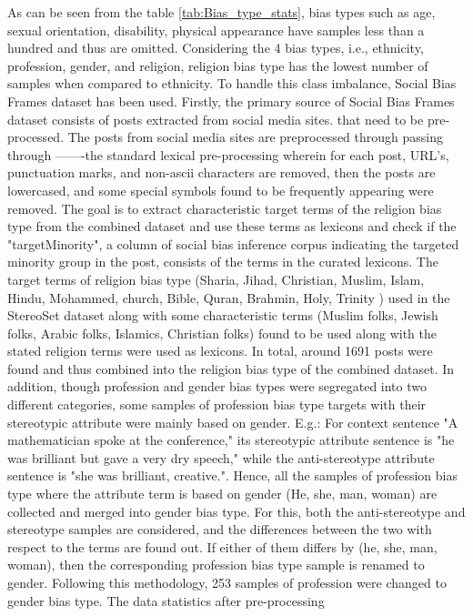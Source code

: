 As can be seen from the table \ref{tab:Bias_type_stats}, bias types such as age, sexual orientation, disability, physical appearance have samples less than a hundred and thus are omitted. Considering the 4 bias types, i.e., ethnicity, profession, gender, and religion, religion bias type has the lowest number of samples when compared to ethnicity. To handle this class imbalance, Social Bias Frames dataset has been used. Firstly, the primary source of Social Bias Frames dataset consists of posts extracted from social media sites. that need to be pre-processed. The posts from social media sites are preprocessed through passing through -------the standard lexical pre-processing wherein for each post, URL's, punctuation marks, and non-ascii characters are removed, then the posts are lowercased, and some special symbols found to be frequently appearing were removed. The goal is to extract characteristic target terms of the religion bias type from the combined dataset and use these terms as lexicons and check if the "targetMinority", a column of social bias inference corpus indicating the targeted minority group in the post, consists of the terms in the curated lexicons. The target terms of religion bias type (Sharia, Jihad, Christian, Muslim, Islam, Hindu, Mohammed, church, Bible, Quran, Brahmin, Holy, Trinity \cite{nadeem2020stereoset}) used in the StereoSet dataset along with some characteristic terms (Muslim folks, Jewish folks, Arabic folks, Islamics, Christian folks) found to be used along with the stated religion terms were used as lexicons. In total, around 1691 posts were found and thus combined into the religion bias type of the combined dataset. In addition, though profession and gender bias types were segregated into two different categories, some samples of profession bias type targets with their stereotypic attribute were mainly based on gender. E.g.: For context sentence "A mathematician spoke at the conference," its stereotypic attribute sentence is "he was brilliant but gave a very dry speech," while the anti-stereotype attribute sentence is "she was brilliant, creative.". Hence, all the samples of profession bias type where the attribute term is based on gender (He, she, man, woman) are collected and merged into gender bias type. For this, both the anti-stereotype and stereotype samples are considered, and the differences between the two with respect to the terms are found out. If either of them differs by (he, she, man, woman), then the corresponding profession bias type sample is renamed to gender. Following this methodology, 253 samples of profession were changed to gender bias type.  The data statistics after pre-processing    

